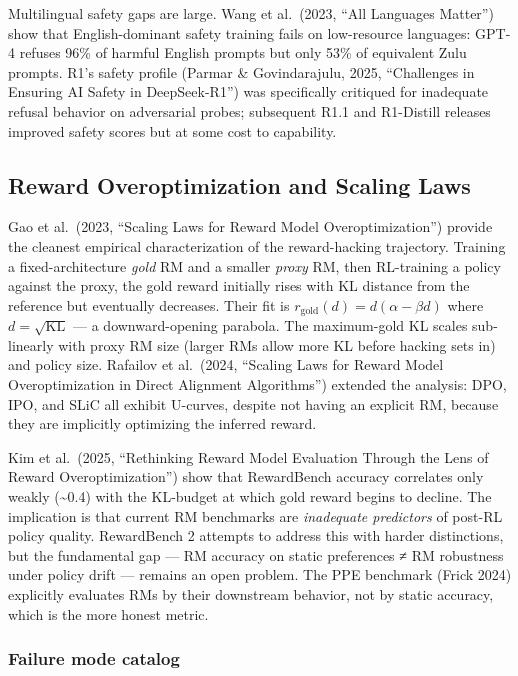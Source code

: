 \documentclass{article}
\begin{document}
Multilingual safety gaps are large. Wang et al.~(2023, ``All Languages Matter'') show that English-dominant safety training fails on low-resource languages: GPT-4 refuses 96\% of harmful English prompts but only 53\% of equivalent Zulu prompts. R1's safety profile (Parmar \& Govindarajulu, 2025, ``Challenges in Ensuring AI Safety in DeepSeek-R1'') was specifically critiqued for inadequate refusal behavior on adversarial probes; subsequent R1.1 and R1-Distill releases improved safety scores but at some cost to capability.

\subsection{Reward Overoptimization and Scaling Laws}\label{reward-overoptimization-and-scaling-laws}

Gao et al.~(2023, ``Scaling Laws for Reward Model Overoptimization'') provide the cleanest empirical characterization of the reward-hacking trajectory. Training a fixed-architecture \emph{gold} RM and a smaller \emph{proxy} RM, then RL-training a policy against the proxy, the gold reward initially rises with KL distance from the reference but eventually decreases. Their fit is \(r_{\text{gold}}(d) = d(\alpha - \beta d)\) where \(d = \sqrt{\mathrm{KL}}\) --- a downward-opening parabola. The maximum-gold KL scales sub-linearly with proxy RM size (larger RMs allow more KL before hacking sets in) and policy size. Rafailov et al.~(2024, ``Scaling Laws for Reward Model Overoptimization in Direct Alignment Algorithms'') extended the analysis: DPO, IPO, and SLiC all exhibit U-curves, despite not having an explicit RM, because they are implicitly optimizing the inferred reward.

Kim et al.~(2025, ``Rethinking Reward Model Evaluation Through the Lens of Reward Overoptimization'') show that RewardBench accuracy correlates only weakly (\textasciitilde0.4) with the KL-budget at which gold reward begins to decline. The implication is that current RM benchmarks are \emph{inadequate predictors} of post-RL policy quality. RewardBench 2 \citep{malik20252025} attempts to address this with harder distinctions, but the fundamental gap --- RM accuracy on static preferences ≠ RM robustness under policy drift --- remains an open problem. The PPE benchmark (Frick 2024) explicitly evaluates RMs by their downstream behavior, not by static accuracy, which is the more honest metric.

\subsubsection{Failure mode catalog}\label{failure-mode-catalog}
\end{document}
